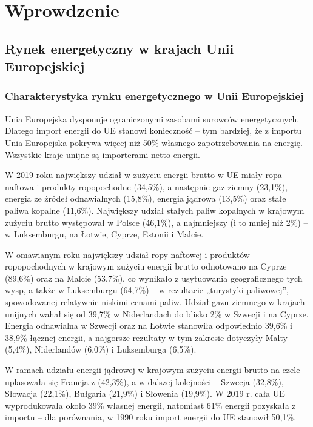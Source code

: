 \documentclass[polish, twoside, 12pt, a4paper]{article}
\theoremstyle{definition}
\theoremstyle{plain}
\theoremstyle{remark}
\begin{document}
\section{Wprowdzenie}

\subsection{Rynek energetyczny w krajach Unii Europejskiej}
\subsubsection{Charakterystyka rynku energetycznego w Unii Europejskiej}

Unia Europejska dysponuje ograniczonymi zasobami surowców energetycznych. Dlatego import energii do UE stanowi konieczność – tym bardziej, że z importu Unia Europejska pokrywa więcej niż 50\% własnego zapotrzebowania na energię. Wszystkie kraje unijne są importerami netto energii. 

W 2019 roku największy udział w zużyciu energii brutto w UE miały ropa naftowa i produkty ropopochodne (34,5\%), a następnie gaz ziemny (23,1\%), energia ze źródeł odnawialnych (15,8\%), energia jądrowa (13,5\%) oraz stałe paliwa kopalne (11,6\%). Największy udział stałych paliw kopalnych w krajowym zużyciu brutto występował w Polsce (46,1\%), a najmniejszy (i to mniej niż 2\%) – w Luksemburgu, na Łotwie, Cyprze, Estonii i Malcie.

W omawianym roku największy udział ropy naftowej i produktów ropopochodnych w krajowym zużyciu energii brutto odnotowano na Cyprze (89,6\%) oraz na Malcie (53,7\%), co wynikało z usytuowania geograficznego tych wysp, a także w Luksemburgu (64,7\%) – w rezultacie „turystyki paliwowej”, spowodowanej relatywnie niskimi cenami paliw. Udział gazu ziemnego w krajach unijnych wahał się od 39,7\% w Niderlandach do blisko 2\% w Szwecji i na Cyprze. Energia odnawialna w Szwecji oraz na Łotwie stanowiła odpowiednio 39,6\% i 38,9\% łącznej energii, a najgorsze rezultaty w tym zakresie dotyczyły Malty (5,4\%), Niderlandów (6,0\%) i Luksemburga (6,5\%). 

W ramach udziału energii jądrowej w krajowym zużyciu energii brutto na czele uplasowała się Francja z (42,3\%), a w dalszej kolejności – Szwecja (32,8\%), Słowacja (22,1\%), Bułgaria (21,9\%) i Słowenia (19,9\%). W 2019 r. cała UE wyprodukowała około 39\% własnej energii, natomiast 61\% energii pozyskała z importu – dla porównania, w 1990 roku import energii do UE stanowił 50,1\%.
\end{document}
